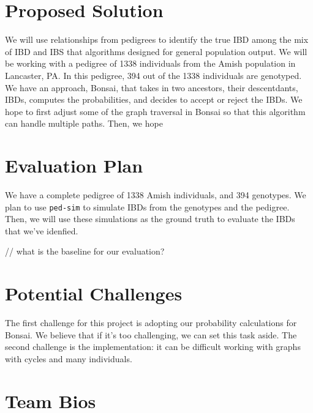\documentclass[12pt]{article}
\begin{document}

\section{Proposed Solution}

We will use relationships from pedigrees to identify the true IBD among the mix of IBD and IBS that algorithms designed for general population output. 
We will be working with a pedigree of 1338 individuals from the Amish population in Lancaster, PA. In this pedigree, 394 out of the 1338 individuals are genotyped\cite{Finke2021}. 
We have an approach, Bonsai\cite{Jewett2021}, that takes in two ancestors, their descentdants, IBDs, computes the probabilities, and decides to accept or reject the IBDs. We hope to first adjust some of the graph traversal in Bonsai so that this algorithm can handle multiple paths. 
Then, we hope 




\section{Evaluation Plan}

We have a complete pedigree of 1338 Amish individuals, and 394 genotypes. We plan to use \texttt{ped-sim} to simulate IBDs from the genotypes and the pedigree. Then, we will use these simulations as the ground truth to evaluate the IBDs that we've idenfied.

// what is the baseline for our evaluation?

\section{Potential Challenges} The first challenge for this project is adopting our probability calculations for Bonsai. We believe that if it's too challenging, we can set this task aside. The second challenge is the implementation: it can be difficult working with graphs with cycles and many individuals.




\section{Team Bios}

\printbibliography
\end{document}
